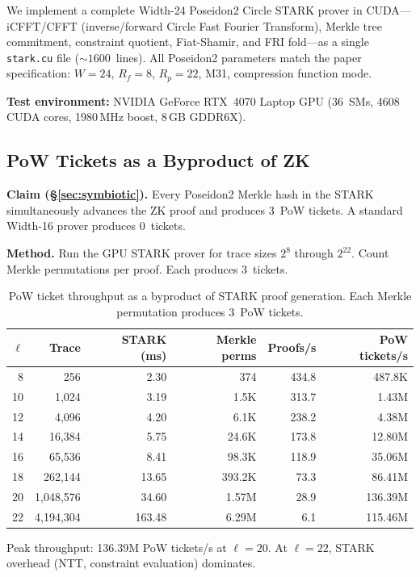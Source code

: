 \documentclass[11pt,a4paper]{article}
\begin{document}
We implement a complete Width-24 Poseidon2 Circle STARK prover in CUDA---iCFFT/CFFT (inverse/forward Circle Fast Fourier Transform), Merkle tree commitment, constraint quotient, Fiat-Shamir, and FRI fold---as a single \texttt{stark.cu} file (${\sim}1600$~lines). All Poseidon2 parameters match the paper specification: $W=24$, $R_f=8$, $R_p=22$, M31, compression function mode.

\textbf{Test environment:} NVIDIA GeForce RTX~4070 Laptop GPU (36~SMs, 4608 CUDA cores, 1980\,MHz boost, 8\,GB GDDR6X).

\subsection{PoW Tickets as a Byproduct of ZK}
\label{sec:gpu-freetickets}

\textbf{Claim (\S\ref{sec:symbiotic}).} Every Poseidon2 Merkle hash in the STARK simultaneously advances the ZK proof and produces 3~PoW tickets. A standard Width-16 prover produces 0~tickets.

\textbf{Method.} Run the GPU STARK prover for trace sizes $2^8$ through $2^{22}$. Count Merkle permutations per proof. Each produces 3~tickets.

\begin{table}[h]
\centering
\small
\begin{tabular}{@{}rrrrrr@{}}
\toprule
$\ell$ & Trace & STARK (ms) & Merkle perms & Proofs/s & PoW tickets/s \\
\midrule
8 & 256 & 2.30 & 374 & 434.8 & 487.8K \\
10 & 1{,}024 & 3.19 & 1.5K & 313.7 & 1.43M \\
12 & 4{,}096 & 4.20 & 6.1K & 238.2 & 4.38M \\
14 & 16{,}384 & 5.75 & 24.6K & 173.8 & 12.80M \\
16 & 65{,}536 & 8.41 & 98.3K & 118.9 & 35.06M \\
18 & 262{,}144 & 13.65 & 393.2K & 73.3 & 86.41M \\
20 & 1{,}048{,}576 & 34.60 & 1.57M & 28.9 & 136.39M \\
22 & 4{,}194{,}304 & 163.48 & 6.29M & 6.1 & 115.46M \\
\bottomrule
\end{tabular}
\caption{PoW ticket throughput as a byproduct of STARK proof generation. Each Merkle permutation produces 3~PoW tickets.}
\label{tab:free-tickets}
\end{table}

Peak throughput: 136.39M PoW tickets/s at $\ell = 20$. At $\ell = 22$, STARK overhead (NTT, constraint evaluation) dominates.
\end{document}
